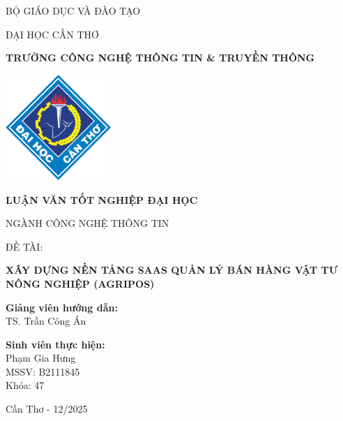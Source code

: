 \documentclass[13pt, a4paper]{report}
\begin{document}



\begin{titlepage}
    \thispagestyle{empty}
    \centering
    {\fontsize{13}{15}\selectfont BỘ GIÁO DỤC VÀ ĐÀO TẠO\par}
    {\fontsize{13}{15}\selectfont ĐẠI HỌC CẦN THƠ\par}
    \vspace{0.2cm}
    {\fontsize{14}{16}\bfseries TRƯỜNG CÔNG NGHỆ THÔNG TIN \& TRUYỀN THÔNG\par}
    
    \vspace{1.5cm}
    \includegraphics[width=4cm]{ctu.png} %
    \vspace{1.5cm}
    
    {\fontsize{14}{16}\bfseries LUẬN VĂN TỐT NGHIỆP ĐẠI HỌC\par}
    \vspace{0.5cm}
    {\fontsize{13}{15}\selectfont NGÀNH CÔNG NGHỆ THÔNG TIN\par}
    
    \vspace{2.5cm}
    {\fontsize{13}{15}\selectfont ĐỀ TÀI:\par}
    \vspace{0.5cm}
    {\fontsize{18}{22}\bfseries\MakeUppercase{Xây dựng nền tảng SaaS quản lý bán hàng vật tư nông nghiệp (AgriPOS)}\par}
    
    \vspace{3cm}
    
    \begin{minipage}[t]{0.45\textwidth}
        \raggedright
        \fontsize{13}{15}\selectfont \textbf{Giảng viên hướng dẫn:} \\
        TS. Trần Công Án
    \end{minipage}
    \hfill
    \begin{minipage}[t]{0.45\textwidth}
        \raggedleft
        \fontsize{13}{15}\selectfont \textbf{Sinh viên thực hiện:} \\
        Phạm Gia Hưng \\
        MSSV: B2111845 \\
        Khóa: 47
    \end{minipage}

    \vfill
    {\fontsize{13}{15}\selectfont Cần Thơ - 12/2025\par}
\end{titlepage}
\end{document}
